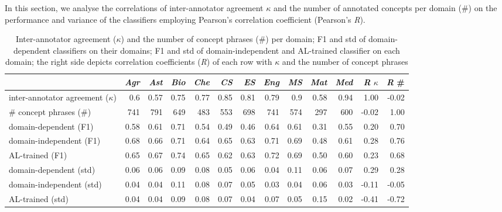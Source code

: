 \documentclass[runningheads]{llncs}
\begin{document}
In this section, we analyse the correlations of inter-annotator agreement $\kappa$ and the number of annotated concepts per domain (\#) on the performance and variance of the classifiers employing Pearson's correlation coefficient (Pearson's \textit{R}).

\begin{table}[htb]
\caption{Inter-annotator agreement ($\kappa$) and the number of concept phrases (\#) per domain; F1 and std of domain-dependent classifiers on their domains; F1 and std of domain-independent and AL-trained classifier on each domain; the right side depicts correlation coefficients (\textit{R}) of each row with $\kappa$ and the number of concept phrases}
\begin{tabular}{l|rrrrrrrrrr|rr}
  & \textit{Agr} & \textit{Ast} & \textit{Bio} & \textit{Che} & \textit{CS} & \textit{ES} & \textit{Eng} & \textit{MS} & \textit{Mat} & \textit{Med} & \textit{R} $\kappa$ & \textit{R} \# \\ \hline        
inter-annotator agreement ($\kappa$) &         0.6           & 0.57          & 0.75         & 0.77          & 0.85          & 0.81          & 0.79          & 0.9           & 0.58          & 0.94 & 1.00 & -0.02          \\
\# concept phrases (\#)         & 741           & 791           & 649          & 483           & 553           & 698           & 741           & 574           & 297           & 600 & -0.02 &  1.00         \\
\hline
domain-dependent (F1)   & 0.58          & 0.61          & 0.71         & 0.54          & 0.49          & 0.46          & 0.64          & 0.61          & 0.31          & 0.55 & 0.20 & 0.70         \\
domain-independent (F1)   & 0.68          & 0.66          & 0.71         & 0.64          & 0.65          & 0.63          & 0.71          & 0.69          & 0.48          & 0.61 & 0.28 & 0.76         \\
AL-trained (F1)   & 0.65	    & 0.67	        & 0.74         & 0.65	       & 0.62	    & 0.63          & 0.72         & 0.69	         & 0.50	        & 0.60& 0.23 & 0.68          \\
\hline
domain-dependent (std)  & 0.06         & 0.06         & 0.09         & 0.08         & 0.05         & 0.06         & 0.04         & 0.11         & 0.06         & 0.07 & 0.29 & 0.28      \\
domain-independent (std) & 0.04 & 0.04 & 0.11 & 0.08 & 0.07 & 0.05  & 0.03 & 0.04 & 0.06 & 0.03 & -0.11 & -0.05 \\
AL-trained (std) & 0.04    & 0.04	& 0.09	& 0.08	& 0.07	& 0.04	& 0.07	& 0.05	& 0.15	& 0.02 & -0.41 & -0.72 \\
\end{tabular}
\label{tab:correlation_variables}
\end{table}
\end{document}
